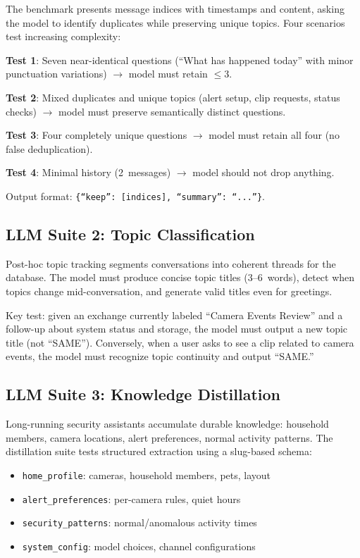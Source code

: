 \documentclass[conference]{IEEEtran}
\begin{document}
The benchmark presents message indices with timestamps and content, asking
the model to identify duplicates while preserving unique topics. Four
scenarios test increasing complexity:

\noindent\textbf{Test 1}: Seven near-identical questions
(``What has happened today'' with minor punctuation
variations) $\rightarrow$ model must retain $\leq$3.

\noindent\textbf{Test 2}: Mixed duplicates and unique topics
(alert setup, clip requests, status checks) $\rightarrow$ model must
preserve semantically distinct questions.

\noindent\textbf{Test 3}: Four completely unique questions $\rightarrow$
model must retain all four (no false deduplication).

\noindent\textbf{Test 4}: Minimal history (2~messages)
$\rightarrow$ model should not drop anything.

Output format: \texttt{\{``keep'': [indices], ``summary'': ``...''\}}.

\subsection{LLM Suite 2: Topic Classification}

Post-hoc topic tracking segments conversations into coherent threads
for the database. The model must produce concise topic titles
(3--6~words), detect when topics change mid-conversation, and generate
valid titles even for greetings.

Key test: given an exchange currently labeled ``Camera Events Review''
and a follow-up about system status and storage, the model must
output a new topic title (not ``SAME''). Conversely, when a user
asks to see a clip related to camera events, the model must
recognize topic continuity and output ``SAME.''

\subsection{LLM Suite 3: Knowledge Distillation}

Long-running security assistants accumulate durable knowledge:
household members, camera locations, alert preferences, normal
activity patterns. The distillation suite tests structured extraction
using a slug-based schema:

\begin{itemize}[nosep]
    \item \texttt{home\_profile}: cameras, household members, pets, layout
    \item \texttt{alert\_preferences}: per-camera rules, quiet hours
    \item \texttt{security\_patterns}: normal/anomalous activity times
    \item \texttt{system\_config}: model choices, channel configurations
\end{itemize}
\end{document}
